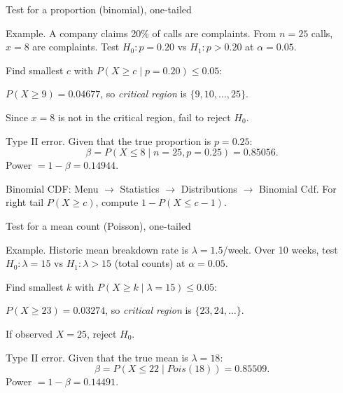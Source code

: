 \documentclass[11pt]{article}
\newcommand{\Hnull}{H_{0}}
\newcommand{\Halt}{H_{1}}
\def\textbf#1{#1}%
\def\texttt#1{#1}%
\def\mathbf#1{#1}%
\def\mathrm#1{#1}%
\begin{document}
\textbf{Test for a proportion (binomial), one-tailed}

\begin{examplebox}
\textbf{Example.} A company claims 20\% of calls are complaints. From $n=25$ calls, $x=8$ are complaints. Test $\Hnull: p=0.20$ vs $\Halt: p>0.20$ at $\alpha=0.05$.

Find smallest $c$ with $P(X\ge c \mid p=0.20) \le 0.05$:

$P(X\ge 9) = \mathbf{0.04677}$, so \emph{critical region} is $\{9,10,\dots,25\}$.

Since $x=8$ is not in the critical region, fail to reject $\Hnull$.
\end{examplebox}

\begin{warningbox}
\textbf{Type II error.} Given that the true proportion is $p=0.25$:
\[
\beta = P(X \le 8 \mid n=25, p=0.25) = \mathbf{0.85056}.
\]
Power $= 1 - \beta = \mathbf{0.14944}$.
\end{warningbox}

\begin{calctip}
\textbf{Binomial CDF:} \texttt{Menu $\rightarrow$ Statistics $\rightarrow$ Distributions $\rightarrow$ Binomial Cdf}. For right tail $P(X\ge c)$, compute $1 - P(X\le c-1)$.
\end{calctip}

\textbf{Test for a mean count (Poisson), one-tailed}

\begin{examplebox}
\textbf{Example.} Historic mean breakdown rate is $\lambda = 1.5$/week. Over 10 weeks, test $\Hnull:\lambda=15$ vs $\Halt:\lambda>15$ (total counts) at $\alpha=0.05$.

Find smallest $k$ with $P(X\ge k \mid \lambda=15) \le 0.05$:

$P(X\ge 23) = \mathbf{0.03274}$, so \emph{critical region} is $\{23,24,\dots\}$.

If observed $X=25$, reject $\Hnull$.
\end{examplebox}

\begin{warningbox}
\textbf{Type II error.} Given that the true mean is $\lambda=18$:
\[
\beta = P(X \le 22 \mid \mathrm{Pois}(18)) = \mathbf{0.85509}.
\]
Power $= 1 - \beta = \mathbf{0.14491}$.
\end{warningbox}
\end{document}
